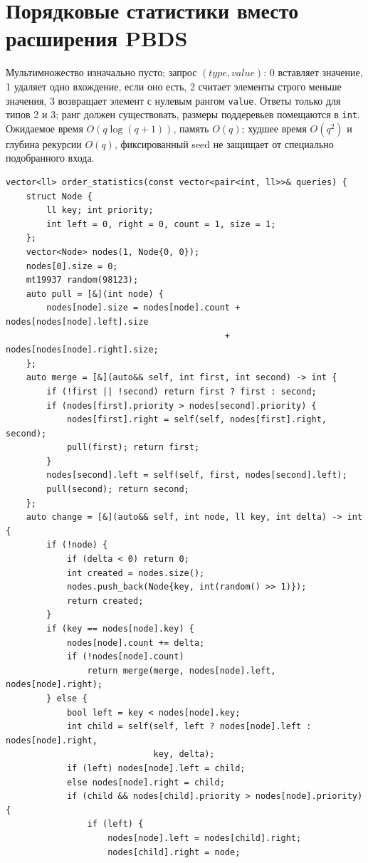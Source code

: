 \section{Порядковые статистики вместо расширения PBDS}
Мультимножество изначально пусто; запрос $(type,value)$: 0 вставляет значение, 1 удаляет одно вхождение, если оно есть, 2 считает элементы строго меньше значения, 3 возвращает элемент с нулевым рангом \texttt{value}.
Ответы только для типов 2 и 3; ранг должен существовать, размеры поддеревьев помещаются в \texttt{int}.
Ожидаемое время $O(q\log(q+1))$, память $O(q)$; худшее время $O(q^2)$ и глубина рекурсии $O(q)$, фиксированный seed не защищает от специально подобранного входа.
\begin{lstlisting}[name=order_statistics]
vector<ll> order_statistics(const vector<pair<int, ll>>& queries) {
    struct Node {
        ll key; int priority;
        int left = 0, right = 0, count = 1, size = 1;
    };
    vector<Node> nodes(1, Node{0, 0});
    nodes[0].size = 0;
    mt19937 random(98123);
    auto pull = [&](int node) {
        nodes[node].size = nodes[node].count + nodes[nodes[node].left].size
                                           + nodes[nodes[node].right].size;
    };
    auto merge = [&](auto&& self, int first, int second) -> int {
        if (!first || !second) return first ? first : second;
        if (nodes[first].priority > nodes[second].priority) {
            nodes[first].right = self(self, nodes[first].right, second);
            pull(first); return first;
        }
        nodes[second].left = self(self, first, nodes[second].left);
        pull(second); return second;
    };
    auto change = [&](auto&& self, int node, ll key, int delta) -> int {
        if (!node) {
            if (delta < 0) return 0;
            int created = nodes.size();
            nodes.push_back(Node{key, int(random() >> 1)});
            return created;
        }
        if (key == nodes[node].key) {
            nodes[node].count += delta;
            if (!nodes[node].count)
                return merge(merge, nodes[node].left, nodes[node].right);
        } else {
            bool left = key < nodes[node].key;
            int child = self(self, left ? nodes[node].left : nodes[node].right,
                             key, delta);
            if (left) nodes[node].left = child;
            else nodes[node].right = child;
            if (child && nodes[child].priority > nodes[node].priority) {
                if (left) {
                    nodes[node].left = nodes[child].right;
                    nodes[child].right = node;

\end{lstlisting}
